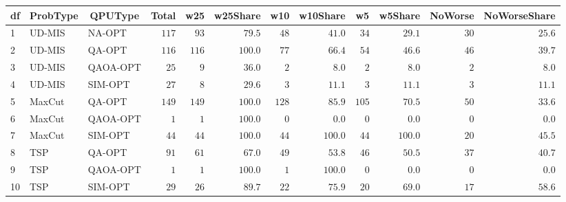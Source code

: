 \begin{table}[!tbp]
\begin{center}
\begin{tabular}{lllrrrrrrrrr}
\hline\hline
\multicolumn{1}{l}{df}&\multicolumn{1}{c}{ProbType}&\multicolumn{1}{c}{QPUType}&\multicolumn{1}{c}{Total}&\multicolumn{1}{c}{w25}&\multicolumn{1}{c}{w25Share}&\multicolumn{1}{c}{w10}&\multicolumn{1}{c}{w10Share}&\multicolumn{1}{c}{w5}&\multicolumn{1}{c}{w5Share}&\multicolumn{1}{c}{NoWorse}&\multicolumn{1}{c}{NoWorseShare}\tabularnewline
\hline
1&UD-MIS&NA-OPT&$117$&$ 93$&$ 79.5$&$ 48$&$ 41.0$&$ 34$&$ 29.1$&$30$&$25.6$\tabularnewline
2&UD-MIS&QA-OPT&$116$&$116$&$100.0$&$ 77$&$ 66.4$&$ 54$&$ 46.6$&$46$&$39.7$\tabularnewline
3&UD-MIS&QAOA-OPT&$ 25$&$  9$&$ 36.0$&$  2$&$  8.0$&$  2$&$  8.0$&$ 2$&$ 8.0$\tabularnewline
4&UD-MIS&SIM-OPT&$ 27$&$  8$&$ 29.6$&$  3$&$ 11.1$&$  3$&$ 11.1$&$ 3$&$11.1$\tabularnewline
5&MaxCut&QA-OPT&$149$&$149$&$100.0$&$128$&$ 85.9$&$105$&$ 70.5$&$50$&$33.6$\tabularnewline
6&MaxCut&QAOA-OPT&$  1$&$  1$&$100.0$&$  0$&$  0.0$&$  0$&$  0.0$&$ 0$&$ 0.0$\tabularnewline
7&MaxCut&SIM-OPT&$ 44$&$ 44$&$100.0$&$ 44$&$100.0$&$ 44$&$100.0$&$20$&$45.5$\tabularnewline
8&TSP&QA-OPT&$ 91$&$ 61$&$ 67.0$&$ 49$&$ 53.8$&$ 46$&$ 50.5$&$37$&$40.7$\tabularnewline
9&TSP&QAOA-OPT&$  1$&$  1$&$100.0$&$  1$&$100.0$&$  0$&$  0.0$&$ 0$&$ 0.0$\tabularnewline
10&TSP&SIM-OPT&$ 29$&$ 26$&$ 89.7$&$ 22$&$ 75.9$&$ 20$&$ 69.0$&$17$&$58.6$\tabularnewline
\hline
\end{tabular}\end{center}
\end{table}
